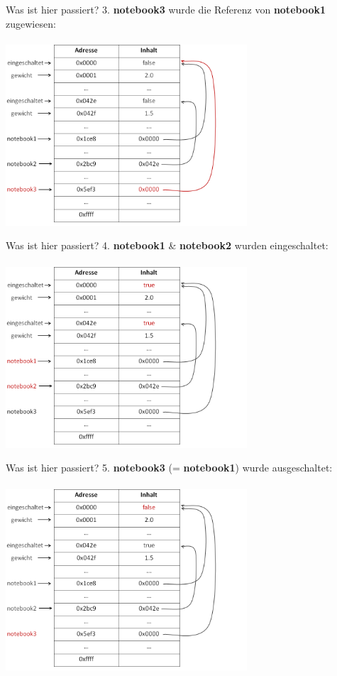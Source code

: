 \documentclass[18pt]{beamer}
\begin{document}
\begin{frame}{Was ist hier passiert?}
3. \textbf{notebook3} wurde die Referenz von \textbf{notebook1} zugewiesen:\\
  \  \\ 
\includegraphics[width=9cm]{logos/notebook3}
\end{frame}

\begin{frame}{Was ist hier passiert?}
4. \textbf{notebook1} \& \textbf{notebook2} wurden eingeschaltet:\\
  \  \\ 
\includegraphics[width=9cm]{logos/eingeschaltet}
\end{frame}

\begin{frame}{Was ist hier passiert?}
5. \textbf{notebook3} (= \textbf{notebook1}) wurde ausgeschaltet:\\
  \  \\ 
\includegraphics[width=9cm]{logos/ausgeschaltet}
\end{frame}
\end{document}
